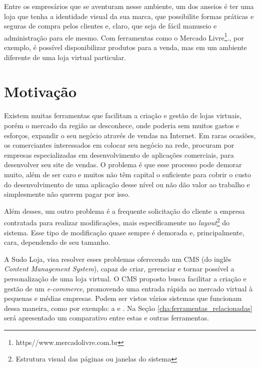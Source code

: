 \documentclass[a4paper,12pt]{monografia}
\begin{document}
Entre os empresários que se aventuram nesse ambiente, um dos anseios é ter uma loja que tenha a identidade visual da sua marca, que possibilite formas práticas e seguras de compra pelos clientes e, claro, que seja de fácil manuseio e administração para ele mesmo. Com ferramentas como o Mercado Livre\footnote{https//www.mercadolivre.com.br}., por exemplo, é possível disponibilizar produtos para a venda, mas em um ambiente diferente de uma loja virtual particular.

\section{Motivação} %
\label{sec:motivacao}

Existem muitas ferramentas que facilitam a criação e gestão de lojas virtuais, porém o mercado da região as desconhece, onde poderia sem muitos gastos e esforços, expandir o seu negócio através de vendas na Internet. Em raras ocasiões, os comerciantes interessados em colocar seu negócio na rede, procuram por empresas especializadas em desenvolvimento de aplicações comerciais, para desenvolver seu site de vendas. O problema é que esse processo pode demorar muito, além de ser caro e muitos não têm capital o suficiente para cobrir o custo do desenvolvimento de uma aplicação desse nível ou não dão valor ao trabalho e simplesmente não querem pagar por isso.

Além desses, um outro problema é a frequente solicitação do cliente a empresa contratada para realizar modificações, mais especificamente no \textit{layout}\footnote{Estrutura visual das páginas ou janelas do sistema} do sistema. Esse tipo de modificação quase sempre é demorada e, principalmente, cara, dependendo de seu tamanho.

A Sudo Loja, visa resolver esses problemas oferecendo um CMS (do inglês \textit{Content Management System}), capaz de criar, gerenciar e tornar possível a personalização de uma loja virtual. O CMS proposto busca facilitar a criação e gestão de um \textit{e-commerce}, promovendo uma entrada rápida ao mercado virtual à pequenas e médias empresas. Podem ser vistos vários sistemas que funcionam dessa maneira, como por exemplo: a  e . Na Seção \ref{cha:ferramentas_relacionadas} será apresentado um comparativo entre estas e outras ferramentas.



\end{document}
